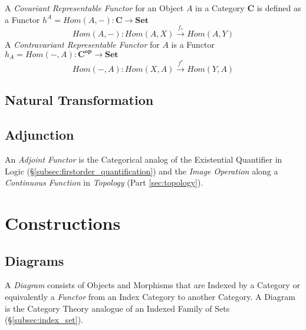 A \emph{Covariant Representable Functor} for an Object $A$ in a
Category $\mathbf{C}$ is defined as a Functor $h^A = Hom(A,-) :
\mathbf{C} \rightarrow \mathbf{Set}$
\[
    Hom(A,-) : Hom(A,X) \xrightarrow{f_*} Hom(A,Y)
\]
A \emph{Contravariant Representable Functor} for $A$ is a Functor $h_A
= Hom(-,A) : \mathbf{C^{op}} \rightarrow \mathbf{Set}$
\[
    Hom(-,A) : Hom(X,A) \xrightarrow{f^*} Hom(Y,A)
\]

\subsection{Natural Transformation}\label{subsec:natural_transformation}

\subsection{Adjunction}\label{subsec:adjunction}

An \emph{Adjoint Functor} is the Categorical analog of the Existential
Quantifier in Logic (\S\ref{subsec:firstorder_quantification}) and the
\emph{Image Operation} along a \emph{Continuous Function} in
\emph{Topology} (Part \ref{sec:topology}).

\section{Constructions}\label{sec:category_construction}

\subsection{Diagrams}\label{subsec:category_diagram}

A \emph{Diagram} consists of Objects and Morphisms that are Indexed by
a Category or equivalently a \emph{Functor} from an Index Category to
another Category. A Diagram is the Category Theory analogue of an
Indexed Family of Sets (\S\ref{subsec:index_set}).

